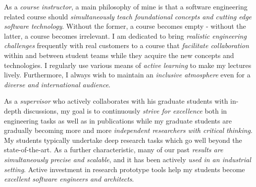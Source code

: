 \documentclass[a4paper,11pt]{article}
\begin{document}
\setcounter{page}{17}

\vspace{12pt}

\begin{tcolorbox}[title=Summary of Teaching Philosophy]
As a \emph{course instructor}, a main philosophy of mine is that a software engineering related course should \emph{simultaneously teach foundational concepts and cutting edge software technology}. Without the former, a course becomes empty - without the latter, a course becomes irrelevant. I am dedicated to bring \emph{realistic engineering challenges} frequently with real customers to a course that \emph{facilitate collaboration} within and between student teams while they acquire the new concepts and technologies. I regularly use various  means of \emph{active learning} to make my lectures lively. Furthermore, I always wish to maintain an \emph{inclusive atmosphere} even for a \emph{diverse and international audience}. 
\vspace{3pt}

As a \emph{supervisor} who actively collaborates with his graduate students with in-depth discussions, my goal is to continuously \emph{strive for excellence} both in engineering tasks as well as in publications while my graduate students are gradually becoming more and more \emph{independent researchers with critical thinking}.  My students typically undertake deep research tasks which go well beyond the state-of-the-art. As a further characteristic, many of our past \emph{results are simultaneously precise and scalable}, and it has been actively \emph{used in an industrial setting}. Active investment in research prototype tools help my students become \emph{excellent software engineers and architects}.
\end{tcolorbox}


\end{document}
